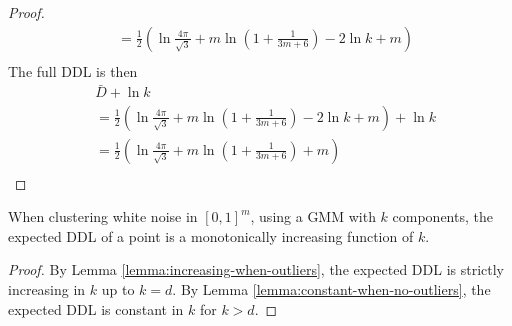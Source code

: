\begin{proof}
\begin{align*}
            &= \frac{1}{2} \left(\ln{\frac{4\pi}{\sqrt{3}}}+ m \ln{\left(1+\frac{1}{3m+6}\right)} - 2\ln{k} + m \right) \\
\end{align*}
The full DDL is then
\begin{align*}
    & \bar{D} + \ln{k} \\
    &= \frac{1}{2} \left(\ln{\frac{4\pi}{\sqrt{3}}}+ m \ln{\left(1+\frac{1}{3m+6}\right)} - 2\ln{k} + m \right)  + \ln{k} \\
    &= \frac{1}{2} \left(\ln{\frac{4\pi}{\sqrt{3}}}+ m \ln{\left(1+\frac{1}{3m+6}\right)} + m \right) \\
\end{align*}
\end{proof}


\begin{theorem}
When clustering white noise in $[0,1]^m$, using a GMM with $k$ components, the expected DDL of a point is a monotonically increasing function of $k$.
\end{theorem}
\begin{proof}
By Lemma \ref{lemma:increasing-when-outliers}, the expected DDL is strictly increasing in $k$ up to $k=d$. By Lemma \ref{lemma:constant-when-no-outliers}, the expected DDL is constant in $k$ for $k > d$.
\end{proof}